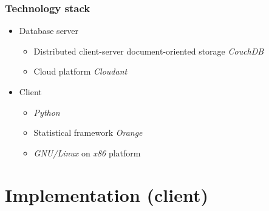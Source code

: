 \documentclass{beamer}
\begin{document}
\begin{frame}
\frametitle{Technology stack}

	\begin{itemize}
		\item Database server
		\begin{itemize}
			\item Distributed client-server document-oriented storage \textit{CouchDB}
			\item Cloud platform \textit{Cloudant}
		\end{itemize}
		\item Client
		\begin{itemize}
			\item \textit{Python}
			\item Statistical framework \textit{Orange}
			\item \textit{GNU/Linux} on \textit{x86} platform
		\end{itemize}
	\end{itemize}

\end{frame}

\section{Implementation (client)}
\end{document}
